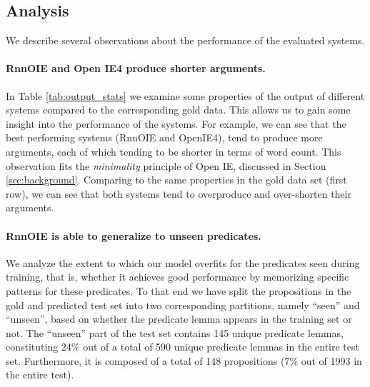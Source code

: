 \subsection{Analysis}
We describe several observations about the performance of the evaluated systems.

\paragraph{RnnOIE and Open IE4 produce shorter arguments.}
In Table \ref{tab:output_stats} we examine some properties of the output of different systems compared to the corresponding gold data.
This allows us to gain some insight into the performance of the systems.
For example, we can see that the best performing systems (RnnOIE and OpenIE4), tend to produce
more arguments, each of which tending to be shorter in terms of word count.
This observation fits the \emph{minimality} principle of Open IE, discussed in Section \ref{sec:background}.
Comparing to the same properties in the gold data set (first row), we can see that both systems
tend to overproduce and over-shorten their arguments.

\paragraph{RnnOIE is able to generalize to unseen predicates.}
We analyze the extent to which our model overfits for the predicates seen during training, that is, whether it achieves good performance by memorizing specific patterns for these predicates.
To that end we have split the propositions in the gold and predicted test set into two corresponding partitions, namely ``seen'' and ``unseen'',
based on whether the predicate lemma appears in the training set or not.
The ``unseen'' part of the test set contains 145 unique predicate lemmas, constituting
24\% out of a total of 590 unique predicate lemmas in the entire test set.
Furthermore, it is composed of a total of 148 propositions (7\% out of 1993 in the entire test).

